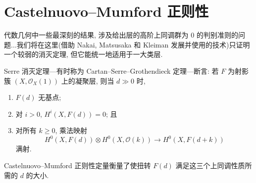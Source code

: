 \section{Castelnuovo--Mumford 正则性}\label{src:2.3}
\begin{epigraph}
代数几何中一些最深刻的结果, 涉及给出层的高阶上同调群为 $0$ 的判别准则的问题...我们将在这里(借助 Nakai, Matsusaka 和 Kleiman 发展并使用的技术)只证明一个较弱的消灭定理, 但它能统一地适用于一大类层.
\end{epigraph}
Serre 消灭定理---有时称为 Cartan--Serre--Grothendieck 定理---断言: 若 $F$ 为射影簇 $(X,\mathcal O_X(1))$ 上的凝聚层, 则当 $d\gg0$ 时, 
\begin{enumerate}[(1)]
\item $F(d)$ 无基点; 
\item 对 $i>0$, $H^i(X,F(d))=0$; 且
\item 对所有 $k\geq0$, 乘法映射
\[
H^0(X,F(d))\otimes H^0(X,\mathcal O(k))
\longrightarrow H^0(X,F(d+k))
\]
满射.
\end{enumerate}
Castelnuovo--Mumford 正则性定量衡量了使扭转 $F(d)$ 满足这三个上同调性质所需的 $d$ 的大小.
